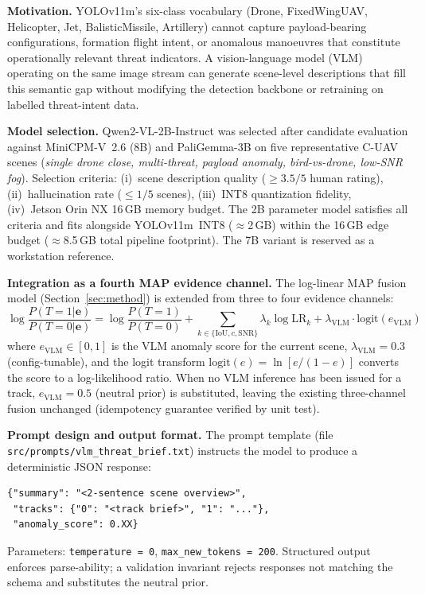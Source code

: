 \documentclass[drones,article,submit,pdftex]{Definitions/mdpi}
\begin{document}
\textbf{Motivation.}
YOLOv11m's six-class vocabulary (Drone, FixedWingUAV, Helicopter, Jet,
BalisticMissile, Artillery) cannot capture payload-bearing configurations,
formation flight intent, or anomalous manoeuvres that constitute operationally
relevant threat indicators.
A vision-language model (VLM) operating on the same image stream can generate
scene-level descriptions that fill this semantic gap without modifying the
detection backbone or retraining on labelled threat-intent data.

\textbf{Model selection.}
Qwen2-VL-2B-Instruct \cite{ref_qwen2vl} was selected after candidate evaluation
against MiniCPM-V~2.6 (8B) and PaliGemma-3B on five representative C-UAV scenes
(\emph{single drone close, multi-threat, payload anomaly, bird-vs-drone,
low-SNR fog}).
Selection criteria: (i)~scene description quality ($\geq 3.5/5$ human rating),
(ii)~hallucination rate ($\leq 1/5$ scenes), (iii)~INT8 quantization fidelity,
(iv)~Jetson Orin NX 16\,GB memory budget.
The 2B parameter model satisfies all criteria and fits alongside YOLOv11m~INT8
($\approx$2\,GB) within the 16\,GB edge budget
($\approx$8.5\,GB total pipeline footprint).
The 7B variant is reserved as a workstation reference.

\textbf{Integration as a fourth MAP evidence channel.}
The log-linear MAP fusion model (Section~\ref{sec:method}) is extended from
three to four evidence channels:
\begin{equation}
  \log \frac{P(T{=}1|\mathbf{e})}{P(T{=}0|\mathbf{e})} =
  \log \frac{P(T{=}1)}{P(T{=}0)} +
  \sum_{k \in \{\text{IoU}, c, \text{SNR}\}} \lambda_k \log \text{LR}_k
  + \lambda_\text{VLM} \cdot \text{logit}(e_\text{VLM})
  \label{eq:map_vlm}
\end{equation}
where $e_\text{VLM} \in [0,1]$ is the VLM anomaly score for the current scene,
$\lambda_\text{VLM} = 0.3$ (config-tunable), and the logit transform
$\text{logit}(e) = \ln[e/(1-e)]$ converts the score to a log-likelihood ratio.
When no VLM inference has been issued for a track, $e_\text{VLM} = 0.5$
(neutral prior) is substituted, leaving the existing three-channel fusion
unchanged (idempotency guarantee verified by unit test).

\textbf{Prompt design and output format.}
The prompt template (file \texttt{src/prompts/vlm\_threat\_brief.txt}) instructs
the model to produce a deterministic JSON response:
\begin{verbatim}
{"summary": "<2-sentence scene overview>",
 "tracks": {"0": "<track brief>", "1": "..."},
 "anomaly_score": 0.XX}
\end{verbatim}
Parameters: \texttt{temperature = 0}, \texttt{max\_new\_tokens = 200}.
Structured output enforces parse-ability; a validation invariant rejects
responses not matching the schema and substitutes the neutral prior.
\end{document}
